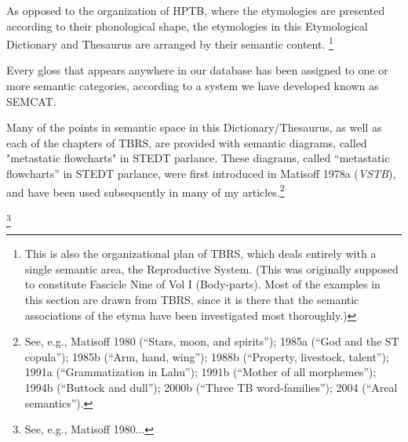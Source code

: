 As opposed to the organization of HPTB, where the etymologies are presented according to their phonological shape, the etymologies in this Etymological Dictionary and Thesaurus are arranged by their semantic content.
\footnote{This is also the organizational plan of TBRS, which deals entirely with a single semantic area, the Reproductive System. (This was originally supposed to constitute Fascicle Nine of Vol I (Body-parts). Most of the examples in this section are drawn from TBRS, since it is there that the semantic associations of the etyma have been investigated most thoroughly.)}

 Every gloss that appears anywhere in our database has been assigned to one or more semantic categories, according to a system we have developed known as SEMCAT.

Many of the points in semantic space in this Dictionary/Thesaurus, as well as each of the chapters of TBRS, are provided with semantic diagrams, called "metastatic flowcharts" in STEDT parlance. These diagrams, called
“metastatic flowcharts” in STEDT parlance, were first introduced in Matisoff 1978a (\textit{VSTB}),
and have been used subsequently in many of my articles.\footnote{See, e.g.,
Matisoff 1980 (“Stars, moon, and spirits”); 1985a (“God and the ST copula”);
1985b (“Arm, hand, wing”); 1988b (“Property, livestock, talent”); 1991a
(“Grammatization in Lahu”); 1991b (“Mother of all morphemes”); 1994b (“Buttock
and dull”); 2000b (“Three TB word-families”); 2004 (“Areal semantics”).}

\footnote{See, e.g., Matisoff 1980...} 

